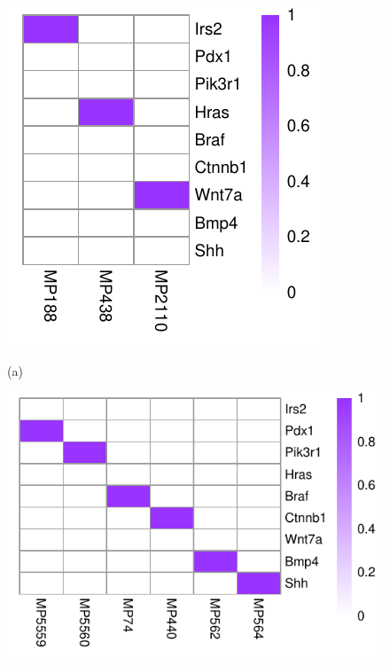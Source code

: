 \documentclass{bmcart}
\begin{document}
\begin{figure}[!h]
  \centering
  \hfil
  \begin{minipage}[t]{.26\linewidth}
  \centering
    \includegraphics[width=\linewidth,origin = l]{DrawPictures/v_1.pdf}
    \centerline{(a)}
  \end{minipage}
  \hfil
  \begin{minipage}[t]{.40\linewidth}
   \includegraphics[width=\linewidth,origin = r]{DrawPictures/v_2.pdf}

\end{minipage}
\end{figure}
\end{document}

